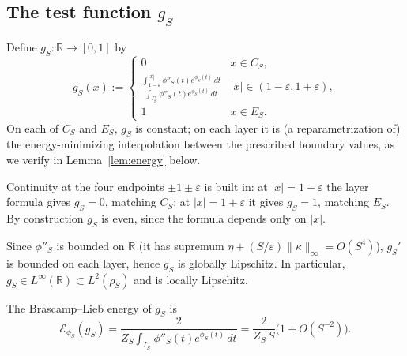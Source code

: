\subsection*{The test function $g_S$}

Define $g_S:\mathbb R\to[0,1]$ by
\begin{equation}\label{eq:gS}
  g_S(x):=
  \begin{cases}
    0 & x\in C_S,\\[4pt]
    \displaystyle
      \frac{\int_{1-\varepsilon}^{|x|}\phi''_S(t)e^{\phi_S(t)}\,dt}
           {\int_{I_S^+}\phi''_S(t)e^{\phi_S(t)}\,dt}
      & |x|\in (1-\varepsilon,1+\varepsilon),\\[12pt]
    1 & x\in E_S.
  \end{cases}
\end{equation}
On each of $C_S$ and $E_S$, $g_S$ is constant; on each layer it is (a
reparametrization of) the energy-minimizing interpolation between the
prescribed boundary values, as we verify in Lemma~\ref{lem:energy} below.

Continuity at the four endpoints $\pm 1\pm\varepsilon$ is built in: at
$|x|=1-\varepsilon$ the layer formula gives $g_S=0$, matching $C_S$; at
$|x|=1+\varepsilon$ it gives $g_S=1$, matching $E_S$. By construction $g_S$
is even, since the formula depends only on $|x|$.

Since $\phi''_S$ is bounded on $\mathbb R$ (it has supremum $\eta+(S/\varepsilon)
\|\kappa\|_\infty=O(S^4)$), $g_S'$ is bounded on each layer, hence $g_S$ is
globally Lipschitz. In particular, $g_S\in L^\infty(\mathbb R)\subset
L^2(\rho_S)$ and is locally Lipschitz.

\begin{lemma}\label{lem:energy}
The Brascamp--Lieb energy of $g_S$ is
\[
  \mathcal E_{\phi_S}(g_S)
  =\frac{2}{Z_S\int_{I_S^+}\phi''_S(t)e^{\phi_S(t)}\,dt}
  =\frac{2}{Z_S\,S}\bigl(1+O(S^{-2})\bigr).
\]
\end{lemma}

